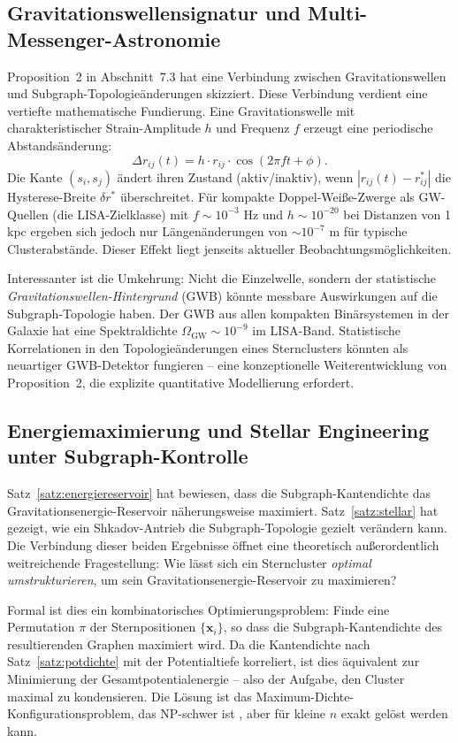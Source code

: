 ﻿\documentclass[a4paper,12pt]{report}
\theoremstyle{definition}
\begin{document}
\subsection{Gravitationswellensignatur und Multi-Messenger-Astro\-nomie}

Proposition~2 in Abschnitt~7.3 hat eine Verbindung zwischen Gravitationswellen und Subgraph-Topologieänderungen skizziert. Diese Verbindung verdient eine vertiefte mathematische Fundierung. Eine Gravitationswelle mit charakteristischer Strain-Amplitude $h$ und Frequenz $f$ erzeugt eine periodische Abstandsänderung:
\[
\Delta r_{ij}(t) = h \cdot r_{ij} \cdot \cos(2\pi f t + \phi).
\]
Die Kante $(s_i, s_j)$ ändert ihren Zustand (aktiv/inaktiv), wenn $|r_{ij}(t) - r_{ij}^*|$ die Hysterese-Breite $\delta r^*$ überschreitet. Für kompakte Doppel-Weiße-Zwerge als GW-Quellen (die LISA-Zielklasse) mit $f \sim 10^{-3}$ Hz und $h \sim 10^{-20}$ bei Distanzen von 1 kpc ergeben sich jedoch nur Längenänderungen von $\sim 10^{-7}$ m für typische Clusterabstände. Dieser Effekt liegt jenseits aktueller Beobachtungsmöglichkeiten.

Interessanter ist die Umkehrung: Nicht die Einzelwelle, sondern der statistische \emph{Gravita\-tionswellen-Hintergrund} (GWB) könnte messbare Auswirkungen auf die Subgraph-Topologie haben. Der GWB aus allen kompakten Binärsystemen in der Galaxie hat eine Spektraldichte $\Omega_\mathrm{GW} \sim 10^{-9}$ im LISA-Band. Statistische Korrelationen in den Topologieänderungen eines Sternclusters könnten als neuartiger GWB-Detektor fungieren -- eine konzeptionelle Weiterentwicklung von Proposition~2, die explizite quantitative Modellierung erfordert.

\subsection{Energiemaximierung und Stellar Engineering unter Sub\-graph-Kontrolle}

Satz~\ref{satz:energiereservoir} hat bewiesen, dass die Subgraph-Kantendichte das Gravitationsenergie-Reservoir näherungsweise maximiert. Satz~\ref{satz:stellar} hat gezeigt, wie ein Shkadov-Antrieb die Subgraph-Topologie gezielt verändern kann. Die Verbindung dieser beiden Ergebnisse öffnet eine theoretisch außerordentlich weitreichende Fragestellung: Wie lässt sich ein Sterncluster \emph{optimal umstrukturieren}, um sein Gravitationsenergie-Reservoir zu maximieren?

Formal ist dies ein kombinatorisches Optimierungsproblem: Finde eine Permutation $\pi$ der Sternpositionen $\{\mathbf{x}_i\}$, so dass die Subgraph-Kantendichte des resultierenden Graphen maximiert wird. Da die Kantendichte nach Satz~\ref{satz:potdichte} mit der Potentialtiefe korreliert, ist dies äquivalent zur Minimierung der Gesamtpotentialenergie -- also der Aufgabe, den Cluster maximal zu kondensieren. Die Lösung ist das Maximum-Dichte-Konfigurationsproblem, das NP-schwer ist \cite{heggie2003}, aber für kleine $n$ exakt gelöst werden kann.
\end{document}

